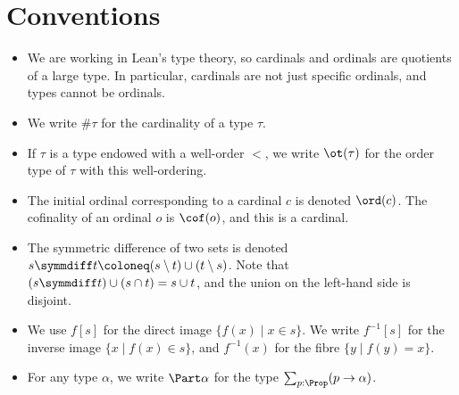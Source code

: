 \section{Conventions}
\begin{itemize}
  \item We are working in Lean's type theory, so cardinals and ordinals are quotients of a large type.
  In particular, cardinals are not just specific ordinals, and types cannot be ordinals.
  \item We write \( \#\tau \) for the cardinality of a type \( \tau \).
  \item If \( \tau \) is a type endowed with a well-order \( < \), we write \( \ot(\tau) \) for the order type of \( \tau \) with this well-ordering.
  \item The initial ordinal corresponding to a cardinal \( c \) is denoted \( \ord(c) \).
  The cofinality of an ordinal \( o \) is \( \cof(o) \), and this is a cardinal.
  \item The symmetric difference of two sets is denoted \( s \symmdiff t \coloneq (s \setminus t) \cup (t \setminus s) \).
  Note that \( (s \symmdiff t) \cup (s \cap t) = s \cup t \), and the union on the left-hand side is disjoint.
  \item We use \( f[s] \) for the direct image \( \{ f(x) \mid x \in s \} \). We write \( f^{-1}[s] \) for the inverse image \( \{ x \mid f(x) \in s \} \), and \( f^{-1}(x) \) for the fibre \( \{ y \mid f(y) = x \} \).
  \item For any type \( \alpha \), we write \( \Part \alpha \) for the type \( \sum_{p : \Prop} (p \to \alpha) \).
\end{itemize}

